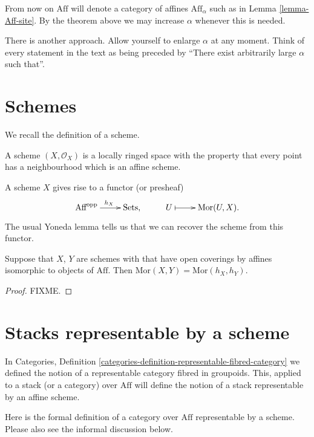 \noindent
From now on $\text{Aff}$ will denote a category of affines $\text{Aff}_\alpha$
such as in Lemma \ref{lemma-Aff-site}. By the theorem above we may increase
$\alpha$ whenever this is needed.

\begin{remark}
\label{remark-other-approach}
There is another approach. Allow yourself to enlarge $\alpha$ at any moment.
Think of every statement in the text as being preceded by ``There exist
arbitrarily large $\alpha$ such that''. 
\end{remark}

\section{Schemes}
\label{section-schemes}

\noindent
We recall the definition of a scheme.

\medskip\noindent
A scheme $(X,\mathcal{O}_X)$ is a locally ringed space
with the property that every point has a neighbourhood which is an
affine scheme.

\medskip\noindent
A scheme $X$ gives rise to a functor (or presheaf)
$$
\xymatrix{
\text{Aff}^{\text{opp}} \ar[r]^{h_X} & \text{Sets}, &
U \ar@{|->}[r] & \text{Mor}(U, X).}
$$
The usual Yoneda lemma tells us that we can recover the scheme from this
functor. 

\begin{lemma}
\label{lemma-yoneda-schemes}
Suppose that $X$, $Y$ are schemes with that have open coverings
by affines isomorphic to objects of $\text{Aff}$. Then $\text{Mor}(X,Y)
= \text{Mor}(h_X, h_Y)$.
\end{lemma}

\begin{proof}
FIXME.
\end{proof}

\section{Stacks representable by a scheme}
\label{section-stack-representable-by-scheme}

\noindent
In Categories, Definition
\ref{categories-definition-representable-fibred-category} we
defined the notion of a representable category fibred in groupoids. This,
applied to a stack (or a category) over $\text{Aff}$ will define the notion of
a stack representable by an affine scheme. 

\medskip\noindent
Here is the formal definition of a category over $\text{Aff}$ representable by
a scheme. Please also see the informal discussion below.


